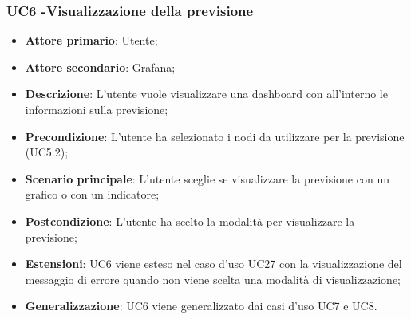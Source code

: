 \subsubsection{UC6 -Visualizzazione della previsione}
\label{sssec:uc6}
\begin{itemize}
  \item \textbf{Attore primario}: Utente;
  \item \textbf{Attore secondario}: Grafana;
  \item \textbf{Descrizione}: L'utente vuole visualizzare una dashboard con all'interno le informazioni sulla previsione;
  \item \textbf{Precondizione}: L'utente ha selezionato i nodi da utilizzare per la previsione (UC5.2);
  \item \textbf{Scenario principale}: L'utente sceglie se visualizzare la previsione con un grafico o con un indicatore;
  \item \textbf{Postcondizione}: L'utente ha scelto la modalità per visualizzare la previsione;
  \item \textbf{Estensioni}: UC6 viene esteso nel caso d'uso UC27 con la visualizzazione del messaggio di errore quando non viene scelta una modalità di visualizzazione;
  \item \textbf{Generalizzazione}: UC6 viene generalizzato dai casi d'uso UC7 e UC8.
\end{itemize}